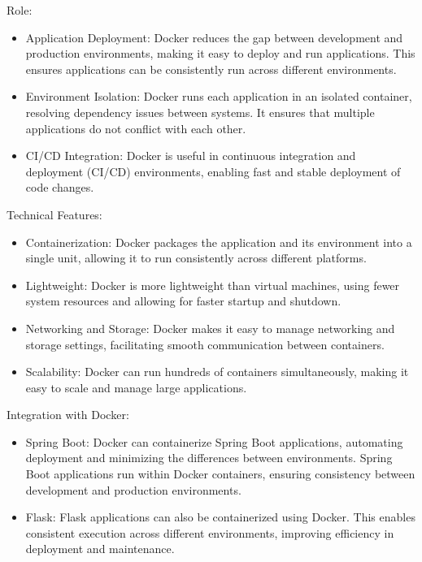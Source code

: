 \documentclass[conference]{IEEEtran}
\begin{document}
Role:
\begin{itemize}
    \item Application Deployment: Docker reduces the gap between development and production environments, making it easy to deploy and run applications. This ensures applications can be consistently run across different environments.\\
    \item Environment Isolation: Docker runs each application in an isolated container, resolving dependency issues between systems. It ensures that multiple applications do not conflict with each other.\\
    \item CI/CD Integration: Docker is useful in continuous integration and deployment (CI/CD) environments, enabling fast and stable deployment of code changes.\\
\end{itemize}

Technical Features:
\begin{itemize}
    \item Containerization: Docker packages the application and its environment into a single unit, allowing it to run consistently across different platforms.\\
    \item Lightweight: Docker is more lightweight than virtual machines, using fewer system resources and allowing for faster startup and shutdown.\\
    \item Networking and Storage: Docker makes it easy to manage networking and storage settings, facilitating smooth communication between containers.\\
    \item Scalability: Docker can run hundreds of containers simultaneously, making it easy to scale and manage large applications.\\
\end{itemize}

Integration with Docker:
\begin{itemize}
    \item Spring Boot: Docker can containerize Spring Boot applications, automating deployment and minimizing the differences between environments. Spring Boot applications run within Docker containers, ensuring consistency between development and production environments.\\
    \item Flask: Flask applications can also be containerized using Docker. This enables consistent execution across different environments, improving efficiency in deployment and maintenance.\\
\end{itemize}
\end{document}

